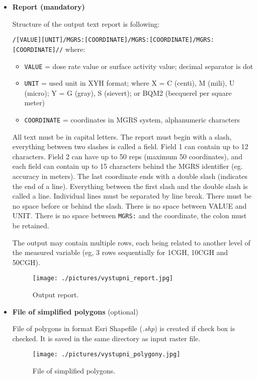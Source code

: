\begin{itemize}
\item{\textbf{Report (mandatory)} 

Structure of the output text report is following:

\texttt{/{[}VALUE{]}{[}UNIT{]}/MGRS:{[}COORDINATE{]}/MGRS:{[}COORDINATE{]}/MGRS:{[}COORDINATE{]}//}
  where:

  \begin{itemize}
  \item{\texttt{VALUE} = dose rate value or surface activity value; decimal separator
    is dot}
  \item{\texttt{UNIT} = used unit in XYH format; where X = C (centi), M (mili), U
    (micro); Y = G (gray), S (sievert); or BQM2 (becquerel per square
    meter)}
  \item{\texttt{COORDINATE} = coordinates in MGRS system, alphanumeric characters}
  \end{itemize}

  All text must be in capital letters. The report must begin with a
  slash, everything between two slashes is called a field. Field 1 can
  contain up to 12 characters. Field 2 can have up to 50 reps (maximum
  50 coordinates), and each field can contain up to 15 characters behind
  the MGRS identifier (eg. accuracy in meters). The last coordinate ends
  with a double slash (indicates the end of a line). Everything between
  the first slash and the double slash is called a line. Individual
  lines must be separated by line break. There must be no space before
  or behind the slash. There is no space between VALUE and UNIT. There
  is no space between \texttt{MGRS:} and the coordinate, the colon must be
  retained.

  The output may contain multiple rows, each being related to another
  level of the measured variable (eg, 3 rows sequentially for 1CGH,
  10CGH and 50CGH).}

\begin{figure}[H]
    \centering
      \texttt{[image: ./pictures/vystupni\_report.jpg]}
      \caption{Output report.}
      \label{fig:report}
\end{figure}
      
\item{\textbf{File of simplified polygons} (optional)

  File of polygons in format Esri Shapefile (\textit{.shp}) is created if check
  box is checked. It is saved in the same directory as input raster
  file.}

\begin{figure}[H]
    \centering
      \texttt{[image: ./pictures/vystupni\_polygony.jpg]}
      \caption{File of simplified polygons.}
      \label{fig:poly}
\end{figure}

\end{itemize}

